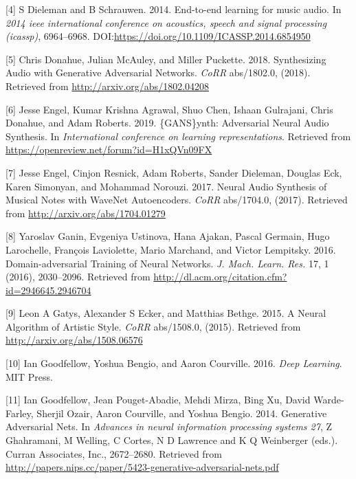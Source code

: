 \documentclass[12pt,a4paper,]{report}
\begin{document}
\leavevmode\hypertarget{ref-6854950}{}%
{[}4{]} S Dieleman and B Schrauwen. 2014. End-to-end learning for music
audio. In \emph{2014 ieee international conference on acoustics, speech
and signal processing (icassp)}, 6964--6968.
DOI:\url{https://doi.org/10.1109/ICASSP.2014.6854950}

\leavevmode\hypertarget{ref-DBLP:journalsux2fcorrux2fabs-1802-04208}{}%
{[}5{]} Chris Donahue, Julian McAuley, and Miller Puckette. 2018.
Synthesizing Audio with Generative Adversarial Networks. \emph{CoRR}
abs/1802.0, (2018). Retrieved from \url{http://arxiv.org/abs/1802.04208}

\leavevmode\hypertarget{ref-engel2018gansynth}{}%
{[}6{]} Jesse Engel, Kumar Krishna Agrawal, Shuo Chen, Ishaan Gulrajani,
Chris Donahue, and Adam Roberts. 2019. \{GANS\}ynth: Adversarial Neural
Audio Synthesis. In \emph{International conference on learning
representations}. Retrieved from
\url{https://openreview.net/forum?id=H1xQVn09FX}

\leavevmode\hypertarget{ref-DBLP:journalsux2fcorrux2fEngelRRDESN17}{}%
{[}7{]} Jesse Engel, Cinjon Resnick, Adam Roberts, Sander Dieleman,
Douglas Eck, Karen Simonyan, and Mohammad Norouzi. 2017. Neural Audio
Synthesis of Musical Notes with WaveNet Autoencoders. \emph{CoRR}
abs/1704.0, (2017). Retrieved from \url{http://arxiv.org/abs/1704.01279}

\leavevmode\hypertarget{ref-Ganin:2016:DTN:2946645.2946704}{}%
{[}8{]} Yaroslav Ganin, Evgeniya Ustinova, Hana Ajakan, Pascal Germain,
Hugo Larochelle, François Laviolette, Mario Marchand, and Victor
Lempitsky. 2016. Domain-adversarial Training of Neural Networks.
\emph{J. Mach. Learn. Res.} 17, 1 (2016), 2030--2096. Retrieved from
\url{http://dl.acm.org/citation.cfm?id=2946645.2946704}

\leavevmode\hypertarget{ref-DBLP:journalsux2fcorrux2fGatysEB15a}{}%
{[}9{]} Leon A Gatys, Alexander S Ecker, and Matthias Bethge. 2015. A
Neural Algorithm of Artistic Style. \emph{CoRR} abs/1508.0, (2015).
Retrieved from \url{http://arxiv.org/abs/1508.06576}

\leavevmode\hypertarget{ref-Goodfellow-et-al-2016}{}%
{[}10{]} Ian Goodfellow, Yoshua Bengio, and Aaron Courville. 2016.
\emph{Deep Learning}. MIT Press.

\leavevmode\hypertarget{ref-NIPS2014_5423}{}%
{[}11{]} Ian Goodfellow, Jean Pouget-Abadie, Mehdi Mirza, Bing Xu, David
Warde-Farley, Sherjil Ozair, Aaron Courville, and Yoshua Bengio. 2014.
Generative Adversarial Nets. In \emph{Advances in neural information
processing systems 27}, Z Ghahramani, M Welling, C Cortes, N D Lawrence
and K Q Weinberger (eds.). Curran Associates, Inc., 2672--2680.
Retrieved from
\url{http://papers.nips.cc/paper/5423-generative-adversarial-nets.pdf}
\end{document}
